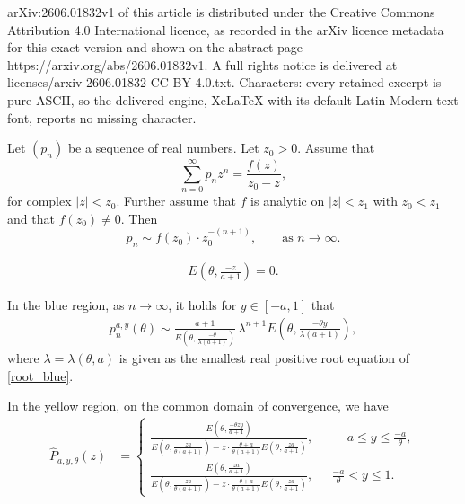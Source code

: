 \documentclass[10pt,a4paper]{amsart}
\begin{document}
arXiv:2606.01832v1 of this article is distributed under the Creative Commons Attribution 4.0 International licence, as recorded in the arXiv licence metadata for this exact version and shown on the abstract page https://arxiv.org/abs/2606.01832v1. A full rights notice is delivered at licenses/arxiv-2606.01832-CC-BY-4.0.txt. Characters: every retained excerpt is pure ASCII, so the delivered engine, XeLaTeX with its default Latin Modern text font, reports no missing character.
\begin{Lemma}\label{asymptotic_powerseries}
    Let $(p_n)$ be a sequence of real numbers. Let $z_0>0$. Assume that
\begin{equation}
\sum_{n=0}^\infty p_n z^n = \frac{f(z)}{z_0-z},
\end{equation}
for complex $|z| < z_0$. Further assume that $f$ is analytic on $|z|<z_1$ with $z_0<z_1$ and that $f(z_0)\neq 0$. Then
$$
p_n \sim f(z_0) \cdot z_0^{-(n+1)},\qquad \text{as $n\to\infty$.}
$$
\end{Lemma}

\begin{align}\label{root_blue}
    E\left(\theta,\frac{-z}{a+1}\right)=0.
\end{align}

\begin{Lemma}\label{asymptotic_blau_erste}
In the blue region, as $n\to\infty$, it holds for $y\in[-a,1]$ that
    \begin{align*}
       p_n^{a,y}(\theta)\sim \frac{a+1}{E\left(\theta,\frac{-\theta }{\lambda(a+1)}\right)}\, \lambda^{n+1}E\left(\theta,\frac{-\theta y}{\lambda(a+1)}\right),
    \end{align*}
    where $\lambda=\lambda(\theta,a)$ is given as the smallest real positive root equation of \eqref{root_blue}.
\end{Lemma}

\begin{Lemma}\label{generatingfunction_gelbe_region}
    In the yellow region, on the common domain of convergence, we have
    \begin{align*}
        \hat{P}_{a,y,\theta}(z)
        &=\begin{cases}
           \frac{E\left(\theta,\frac{-\theta zy}{a+1}\right)}{E\left(\theta,\frac{za}{\theta(a+1)}\right)-z\cdot\frac{ \theta +a}{\theta(a+1)}E\left(\theta,\frac{za}{a+1}\right)},~~&~-a\leq y \leq \frac{-a}{\theta},
            \\\frac{E\left(\theta,\frac{za}{a+1}\right)}{E\left(\theta,\frac{za}{\theta(a+1)}\right)-z\cdot\frac{\theta +a}{\theta(a+1)}E\left(\theta,\frac{za}{a+1}\right)},~~&~\frac{-a}{\theta}<y\leq1.
        \end{cases}    
    \end{align*}
\end{Lemma}
\end{document}
